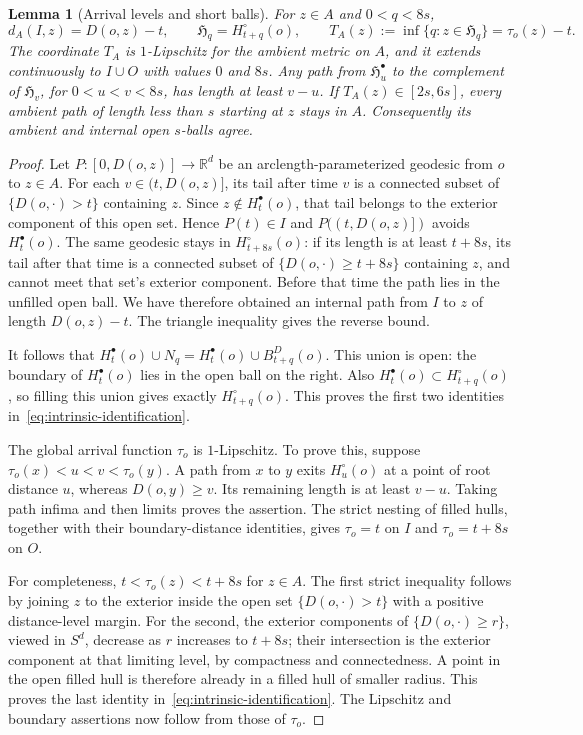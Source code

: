 \documentclass[11pt,reqno]{amsart}
\theoremstyle{plain}
\newtheorem{lemma}[theorem]{Lemma}
\theoremstyle{definition}
\theoremstyle{remark}
\newcommand{\R}{\mathbb R}
\newcommand{\1}{\mathbf{1}}
\newcommand{\bd}{B^{D}}
\begin{document}
\begin{lemma}[Arrival levels and short balls]\label{lem:intrinsic-arrival}
For $z\in A$ and $0<q<8s$,
\begin{equation}\label{eq:intrinsic-identification}
d_A(I,z)=D(o,z)-t,\qquad
\mathfrak H_q=H_{t+q}^\circ(o),\qquad
T_A(z):=\inf\{q:z\in\mathfrak H_q\}=\tau_o(z)-t.
\end{equation}
The coordinate $T_A$ is $1$-Lipschitz for the ambient metric on $A$, and it extends continuously to $I\cup O$ with values $0$ and $8s$. Any path from $\mathfrak H_u^\bullet$ to the complement of $\mathfrak H_v$, for $0<u<v<8s$, has length at least $v-u$. If $T_A(z)\in[2s,6s]$, every ambient path of length less than $s$ starting at $z$ stays in $A$. Consequently its ambient and internal open $s$-balls agree.
\end{lemma}
\begin{proof}
Let $P:[0,D(o,z)]\to\R^d$ be an arclength-parameterized geodesic from $o$ to $z\in A$. For each $v\in(t,D(o,z)]$, its tail after time $v$ is a connected subset of $\{D(o,\cdot)>t\}$ containing $z$. Since $z\notin H_t^\bullet(o)$, that tail belongs to the exterior component of this open set. Hence $P(t)\in I$ and $P((t,D(o,z)])$ avoids $H_t^\bullet(o)$. The same geodesic stays in $H_{t+8s}^\circ(o)$: if its length is at least $t+8s$, its tail after that time is a connected subset of $\{D(o,\cdot)\ge t+8s\}$ containing $z$, and cannot meet that set's exterior component. Before that time the path lies in the unfilled open ball. We have therefore obtained an internal path from $I$ to $z$ of length $D(o,z)-t$. The triangle inequality gives the reverse bound.

It follows that $H_t^\bullet(o)\cup N_q=H_t^\bullet(o)\cup\bd_{t+q}(o)$. This union is open: the boundary of $H_t^\bullet(o)$ lies in the open ball on the right. Also $H_t^\bullet(o)\subset H_{t+q}^\circ(o)$, so filling this union gives exactly $H_{t+q}^\circ(o)$. This proves the first two identities in~\eqref{eq:intrinsic-identification}.

The global arrival function $\tau_o$ is $1$-Lipschitz. To prove this, suppose $\tau_o(x)<u<v<\tau_o(y)$. A path from $x$ to $y$ exits $H_u^\circ(o)$ at a point of root distance $u$, whereas $D(o,y)\ge v$. Its remaining length is at least $v-u$. Taking path infima and then limits proves the assertion. The strict nesting of filled hulls, together with their boundary-distance identities, gives $\tau_o=t$ on $I$ and $\tau_o=t+8s$ on $O$.

For completeness, $t<\tau_o(z)<t+8s$ for $z\in A$. The first strict inequality follows by joining $z$ to the exterior inside the open set $\{D(o,\cdot)>t\}$ with a positive distance-level margin. For the second, the exterior components of $\{D(o,\cdot)\ge r\}$, viewed in $S^d$, decrease as $r$ increases to $t+8s$; their intersection is the exterior component at that limiting level, by compactness and connectedness. A point in the open filled hull is therefore already in a filled hull of smaller radius. This proves the last identity in~\eqref{eq:intrinsic-identification}. The Lipschitz and boundary assertions now follow from those of $\tau_o$.


\end{proof}
\end{document}
